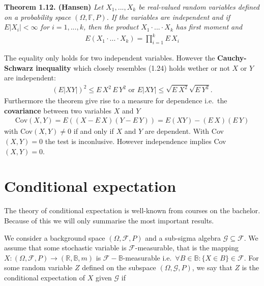 \documentclass[
]{book}
\begin{document}
\textbf{Theorem 1.12. (Hansen)} \emph{Let \(X_1,...,X_k\) be real-valued random variables defined on a probability space \((\Omega, \mathbb{F},P)\). If the variables are independent and if \(E\vert X_i\vert<\infty\) for \(i=1,...,k\), then the product \(X_1\cdot ...\cdot X_k\) has first moment and}
\begin{align*}
    E\left(X_1\cdot ... \cdot X_k\right)=\prod_{i=1}^kE\, X_i\tag{1.24}
\end{align*}

The equality only holds for two independent variables. However the \textbf{Cauchy-Schwarz inequality} which closely resembles (1.24) holds wether or not \(X\) or \(Y\) are independent:
\begin{align*}
    \left(E\vert XY\vert\right)^2\le E\, X^2\, E\, Y^2\text{ or }E\vert XY\vert \le \sqrt{E\ X^2}\sqrt{E\ Y^2}.\tag{1.25}
\end{align*}
Furthermore the theorem give rise to a measure for dependence i.e.~the \textbf{covariance} between two variables \(X\) and \(Y\)
\begin{align*}
    \text{Cov}(X,Y)=E\left((X-E\,X)(Y-E\,Y)\right)=E(XY)-(E\, X)(E\, Y)\tag{1.26}
\end{align*}
with Cov\((X,Y)\ne 0\) if and only if \(X\) and \(Y\) are dependent. With Cov\((X,Y)=0\) the test is inconlusive. However independence implies Cov\((X,Y)=0\).

\newpage

\hypertarget{conditional-expectation}{%
\section{Conditional expectation}\label{conditional-expectation}}

The theory of conditional expectation is well-known from courses on the bachelor. Because of this we will only summarise the most important results.

We consider a background space \((\Omega,\mathcal{F},P)\) and a sub-sigma algebra \(\mathcal{G}\subseteq \mathcal{F}\). We assume that some stochastic variable is \(\mathcal{F}\)-measurable, that is the mapping \(X : (\Omega,\mathcal{F},P) \to (\mathbb{R},\mathbb{B},m)\) is \(\mathcal{F}-\mathbb{B}\)-measurable i.e.~\(\forall B\in\mathbb{B} : \{X\in B\}\in\mathcal{F}\). For some random variable \(Z\) defined on the subspace \((\Omega,\mathcal{G},P)\), we say that \(Z\) is the conditional expectation of \(X\) given \(\mathcal{G}\) if
\end{document}
